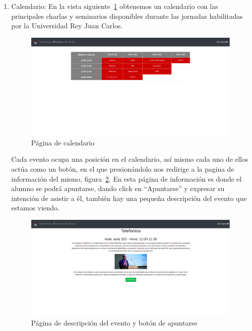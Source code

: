 \documentclass[a4paper, 12pt]{book}
\begin{document}
\begin{enumerate}
  \item Calendario: En la vista siguiente~\ref{fig:horario} obtenemos un calendario con las principales charlas y seminarios disponibles durante las jornadas habilitadas por la Universidad Rey Juan Carlos. 

\begin{figure}
  	\centering
  	\includegraphics[width=16cm, keepaspectratio]{img/horario.png}
  	\caption{Página de calendario}\label{fig:horario}
	\end{figure}
  
  Cada evento ocupa una posición en el calendario, así mismo cada uno de ellos actúa como un botón, en el que presionándolo nos redirige a la pagina de información del mismo, figura~\ref{fig:descripEvento}. En esta página de información es donde el alumno se podrá apuntarse, dando click en ``Apuntarse'' y expresar su intención de asistir a él, también hay una pequeña descripción del evento que estamos viendo.
  
  \begin{figure}
  	\centering
  	\includegraphics[width=16cm, keepaspectratio]{img/descripEvento.png}
  	\caption{Página de descripción del evento y botón de apuntarse}\label{fig:descripEvento}
	\end{figure}
  

\end{enumerate}
\end{document}
